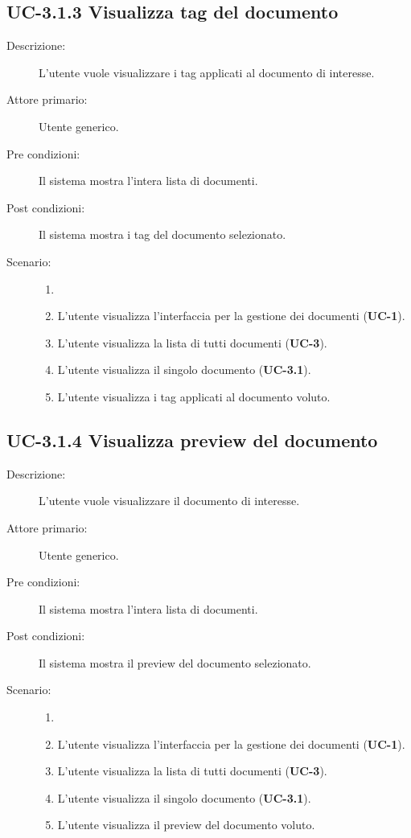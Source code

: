 \subsection{UC-3.1.3 Visualizza tag del documento}
\begin{description}
    \item[Descrizione:] L'utente vuole visualizzare i tag applicati al documento di interesse.
    \item[Attore primario:] Utente generico.
    \item[Pre condizioni:] Il sistema mostra l’intera lista di documenti.
    \item[Post condizioni:] Il sistema mostra i tag del documento selezionato.
    \item[Scenario:]
    \begin{enumerate}
        \item[] 
        \item L’utente visualizza l'interfaccia per la gestione dei documenti (\textbf{UC-1}).
        \item L’utente visualizza la lista di tutti documenti (\textbf{UC-3}).
        \item L'utente visualizza il singolo documento (\textbf{UC-3.1}).
        \item L'utente visualizza i tag applicati al documento voluto.
    \end{enumerate}
\end{description}

\subsection{UC-3.1.4 Visualizza preview del documento}
\begin{description}
    \item[Descrizione:] L'utente vuole visualizzare il documento di interesse.
    \item[Attore primario:] Utente generico.
    \item[Pre condizioni:] Il sistema mostra l’intera lista di documenti.
    \item[Post condizioni:] Il sistema mostra il preview del documento selezionato.
    \item[Scenario:]
    \begin{enumerate}
        \item[] 
        \item L’utente visualizza l'interfaccia per la gestione dei documenti (\textbf{UC-1}).
        \item L’utente visualizza la lista di tutti documenti (\textbf{UC-3}).
        \item L'utente visualizza il singolo documento (\textbf{UC-3.1}).
        \item L'utente visualizza il preview del documento voluto.
    \end{enumerate}
\end{description}

